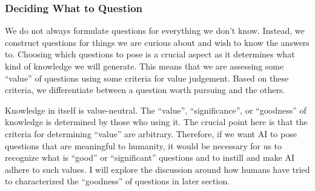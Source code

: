 
\subsubsection{Deciding What to Question}
We do not always formulate questions for everything we don't know. Instead, we construct questions for things we are curious about and wish to know the answers to. Choosing which questions to pose is a crucial aspect as it determines what kind of knowledge we will generate. This means that we are assessing some ``value'' of questions using some criteria for value judgement. Based on these criteria, we differentiate between a question worth pursuing and the others.

Knowledge in itself is value-neutral. The ``value'', ``significance'', or ``goodness'' of knowledge is determined by those who using it. The crucial point here is that the criteria for determining ``value'' are arbitrary. Therefore, if we want AI to pose questions that are meaningful to humanity, it would be necessary for us to recognize what is ``good'' or ``significant'' questions and to instill and make AI adhere to such values. I will explore the discussion around how humans have tried to characterized the ``goodness'' of questions in later section. 

